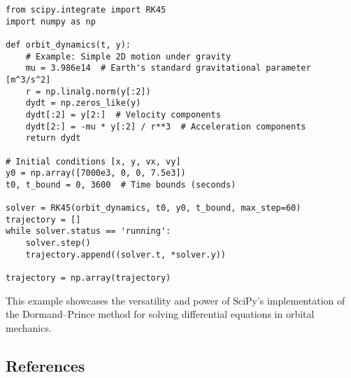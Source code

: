 \begin{verbatim}
from scipy.integrate import RK45
import numpy as np

def orbit_dynamics(t, y):
    # Example: Simple 2D motion under gravity
    mu = 3.986e14  # Earth's standard gravitational parameter [m^3/s^2]
    r = np.linalg.norm(y[:2])
    dydt = np.zeros_like(y)
    dydt[:2] = y[2:]  # Velocity components
    dydt[2:] = -mu * y[:2] / r**3  # Acceleration components
    return dydt

# Initial conditions [x, y, vx, vy]
y0 = np.array([7000e3, 0, 0, 7.5e3])
t0, t_bound = 0, 3600  # Time bounds (seconds)

solver = RK45(orbit_dynamics, t0, y0, t_bound, max_step=60)
trajectory = []
while solver.status == 'running':
    solver.step()
    trajectory.append((solver.t, *solver.y))

trajectory = np.array(trajectory)
\end{verbatim}

This example showcases the versatility and power of SciPy's implementation of the Dormand–Prince method for solving differential equations in orbital mechanics.

\subsection{References}
	

\endinput  %
